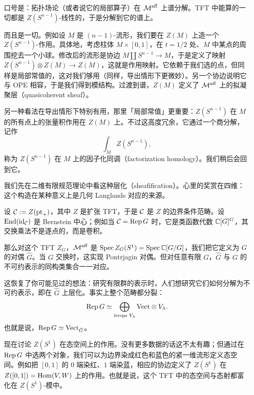 口号是：拓扑场论（或者说它的局部算子）在 $\mathcal{M}^{\mathrm{aff}}$ 上谱分解。TFT 中能算的一切都是 $Z(S^{n-1})$-线性的，于是分解到它的谱上。


而且是一切。例如设 $M$ 是 $(n-1)$-流形，我们要在 $Z(M)$ 上造一个 $Z(S^{n-1})$-作用。具体地，考虑柱体 $M\times[0,1]$，在 $t=1/2$ 处、$M$ 中某点的周围挖去一个小球。修改后的流形是协边 $M\amalg S^{n-1}\to M$，于是定义了映射 $Z(S^{n-1})\otimes Z(M)\to Z(M)$，这就是作用映射。它依赖于我们选的点，但同样是局部常值的，这对我们够用（同样，导出情形下更微妙）。另一个协边说明它与 OPE 相容，于是我们得到模结构。过渡到谱，$Z(M)$ 定义了 $\mathcal{M}^{\mathrm{aff}}$ 上的拟凝聚层（quasicoherent sheaf）。

另一种看法在导出情形下特别有用，那里「局部常值」更重要：$Z(S^{n-1})$ 在 $M$ 的所有点上的张量积作用在 $Z(M)$ 上。不过这高度冗余，它通过一个商分解，记作
\[
\int_M Z(S^{n-1}),
\]
称为 $Z(S^{n-1})$ 在 $M$ 上的因子化同调（factorization homology）。我们稍后会回到它。

我们先在二维有限规范理论中看这种层化（sheafification）。心里的奖赏在四维：这个构造在某种意义上是几何 Langlands 对应的来源。

\begin{example}[二维 TFT]
设 $\mathcal{C}:=Z(\mathrm{pt}_+)$，其中 $Z$ 是扩张 TFT，于是 $\mathcal{C}$ 是 $Z$ 的边界条件范畴。设 $\operatorname{End}(\operatorname{id}_{\mathcal{C}})$ 是 Bernstein 中心；例如当 $\mathcal{C}=\operatorname{Rep} G$ 时，它是类函数代数 $\mathbb{C}[G]^G$，其交换乘法不是逐点的，而是卷积。

那么对这个 TFT $Z_G$，$\mathcal{M}^{\mathrm{aff}}$ 是 $\operatorname{Spec} Z_G(S^1)=\operatorname{Spec}\mathbb{C}[G/G]$，我们把它定义为 $G$ 的对偶 $\hat G$。当 $G$ 交换时，这实现 Pontrjagin 对偶。但对任意有限 $G$，$\hat G$ 与 $G$ 的不可约表示的同构类集合一一对应。
\end{example}

这恢复了你可能见过的想法：研究有限群的表示时，人们想研究它们如何分解为不可约表示，即在 $\hat G$ 上层化。事实上整个范畴都分裂：
\[
\operatorname{Rep} G\simeq\bigoplus_{\text{irreps }V_\lambda}\mathrm{Vect}\otimes V_\lambda .
\]
也就是说，$\operatorname{Rep} G\simeq\mathrm{Vect}_{\hat G}$。

现在讨论 $Z(S^1)$ 在态空间上的作用。没有更多数据的话这不太有趣；但通过在 $\operatorname{Rep} G$ 中选两个对象，我们可以为边界染成红色和蓝色的紧一维流形定义态空间。例如把 $[0,1]$ 的 $0$ 端染红、$1$ 端染蓝，相应的协边定义了 $Z(S^1)$ 在 $Z([0,1])=\operatorname{Hom}(V,W)$ 上的作用。也就是说，这个 TFT 中的态空间与态射都富化在 $Z(S^1)$-模中。

